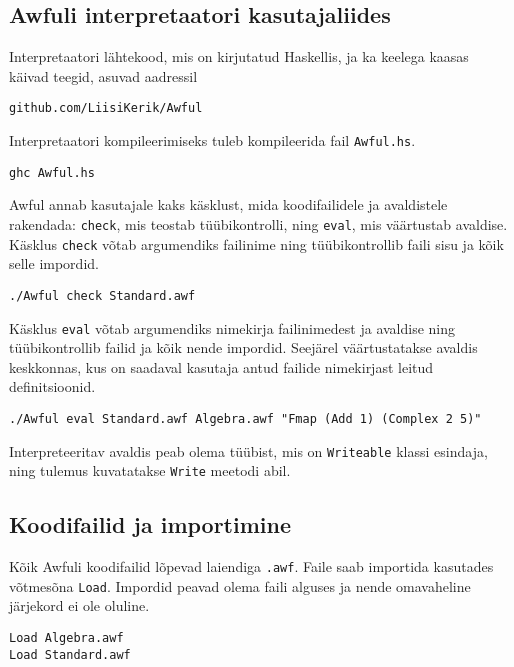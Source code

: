 \documentclass[12pt]{article}
\begin{document}
    \subsection{Awfuli interpretaatori kasutajaliides}
      Interpretaatori lähtekood, mis on kirjutatud Haskellis, ja ka keelega kaasas käivad teegid, asuvad aadressil

      \begin{verbatim}github.com/LiisiKerik/Awful\end{verbatim}

      Interpretaatori kompileerimiseks tuleb kompileerida fail \verb!Awful.hs!.

      \begin{verbatim}ghc Awful.hs\end{verbatim}

      Awful annab kasutajale kaks käsklust, mida koodifailidele ja avaldistele rakendada: \verb!check!, mis teostab tüübikontrolli, ning \verb!eval!, mis väärtustab avaldise. Käsklus \verb!check! võtab argumendiks failinime ning tüübikontrollib faili sisu ja kõik selle impordid.

      \begin{verbatim}./Awful check Standard.awf\end{verbatim}

      Käsklus \verb!eval! võtab argumendiks nimekirja failinimedest ja avaldise ning tüübikontrollib failid ja kõik nende impordid. Seejärel väärtustatakse avaldis keskkonnas, kus on saadaval kasutaja antud failide nimekirjast leitud definitsioonid.

      \begin{verbatim}./Awful eval Standard.awf Algebra.awf "Fmap (Add 1) (Complex 2 5)"\end{verbatim}

      Interpreteeritav avaldis peab olema tüübist, mis on \verb!Writeable! klassi esindaja, ning tulemus kuvatatakse \verb!Write! meetodi abil.
    \subsection{Koodifailid ja importimine}
      Kõik Awfuli koodifailid lõpevad laiendiga \verb!.awf!. Faile saab importida kasutades võtmesõna \verb!Load!. Impordid peavad olema faili alguses ja nende omavaheline järjekord ei ole oluline.

      \begin{verbatim}Load Algebra.awf
Load Standard.awf\end{verbatim}
\end{document}
